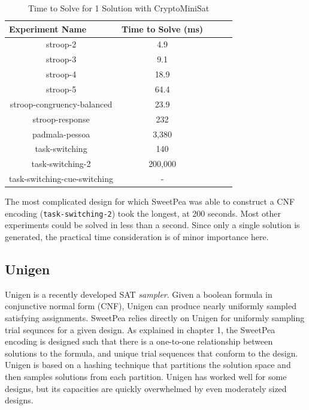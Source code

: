
\begin{table}[t]
  \centering
  \caption{Time to Solve for 1 Solution with CryptoMiniSat}
\begin{tabular}{|c|c|c|c|c|}
\hline
\multicolumn{1}{|l|}{Experiment Name} & Time to Solve (ms)  \\ \hline
stroop-2                              & 4.9                 \\ \hline
stroop-3                              & 9.1                 \\ \hline
stroop-4                              & 18.9                \\ \hline
stroop-5                              & 64.4                \\ \hline
stroop-congruency-balanced            & 23.9                \\ \hline
stroop-response                       & 232                 \\ \hline
padmala-pessoa                        & 3,380               \\ \hline
task-switching                        & 140                 \\ \hline
task-switching-2                      & 200,000             \\ \hline
task-switching-cue-switching          & -                   \\ \hline
\end{tabular}
\label{tab:benchmark_experiments_cmsat}%
\end{table}

The most complicated design for which SweetPea was able to construct a CNF encoding (\texttt{task-switching-2}) took the longest, at 200 seconds. Most other experiments could be solved in less than a second. Since only a single solution is generated, the practical time consideration is of minor importance here.


\subsection{Unigen}

Unigen \cite{chakraborty2013scalable,chakraborty_balancing_2014} is a recently developed SAT \textit{sampler}. Given a boolean formula in conjunctive normal form (CNF), Unigen can produce nearly uniformly sampled satisfying assignments. SweetPea relies directly on Unigen for uniformly sampling trial sequnces for a given design. As explained in chapter 1, the SweetPea encoding is designed such that there is a one-to-one relationship between solutions to the formula, and unique trial sequences that conform to the design. Unigen is based on a hashing technique that partitions the solution space and then samples solutions from each partition. Unigen has worked well for some designs, but its capacities are quickly overwhelmed by even moderately sized designs.

